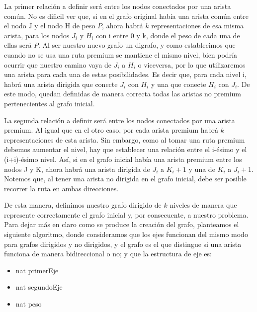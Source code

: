 La primer relación a definir será entre los nodos conectados por una arista común. No es dificil ver que, si en el grafo original había una arista común entre el nodo J y el nodo H de peso $P$, ahora habrá $k$ representaciones de esa misma arista, para los nodos $J_i$ y $H_i$ con i entre 0 y k, donde el peso de cada una de ellas será $P$. Al ser nuestro nuevo grafo un digrafo, y como establecimos que cuando no se usa una ruta premium se mantiene el mismo nivel, bien podría ocurrir que nuestro camino vaya de $J_i$ a $H_i$ o viceversa, por lo que utilizaremos una arista para cada una de estas posibilidades. Es decir que, para cada nivel i, habrá una arista dirigida que conecte $J_i$ con $H_i$ y una que conecte $H_i$ con $J_i$. De este modo, quedan definidas de manera correcta todas las aristas no premium pertenecientes al grafo inicial.

La segunda relación a definir será entre los nodos conectados por una arista premium. Al igual que en el otro caso, por cada arista premium habrá $k$ representaciones de esta arista. Sin embargo, como al tomar una ruta premium debemos aumentar el nivel, hay que establecer una relación entre el i-ésimo y el (i+i)-ésimo nivel. Así, si en el grafo inicial había una arista premium entre los nodos J y K, ahora habrá una arista dirigida de $J_i$ a $K_i+1$ y una de $K_i$ a $J_i+1$. Notemos que, al tener una arista no dirigida en el grafo inicial, debe ser posible recorrer la ruta en ambas direcciones.

De esta manera, definimos nuestro grafo dirigido de $k$ niveles de manera que represente correctamente el grafo inicial y, por consecuente, a nuestro problema. Para dejar más en claro como se produce la creación del grafo, planteamos el siguiente algoritmo, donde consideramos que los ejes funcionan del mismo modo para grafos dirigidos y no dirigidos, y el grafo es el que distingue si una arista funciona de manera bidireccional o no; y que la estructura de eje es:

\begin{itemize}
	\item nat primerEje

	\item nat segundoEje

	\item nat peso
\end{itemize}

\begin{algorithm}[H]
	\NoCaptionOfAlgo
	\caption{}
	
\end{algorithm}
	
